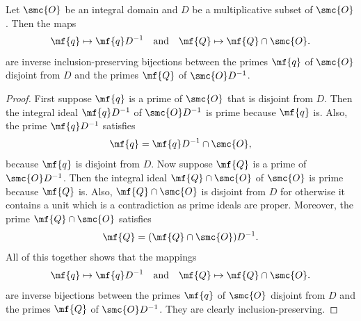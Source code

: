     \begin{proposition}\label{prop:localization_prime_bijection}
      Let \(\smc{O}\) be an integral domain and \(D\) be a multiplicative subset of \(\smc{O}\). Then the maps
      \[
        \mf{q} \mapsto \mf{q}D^{-1} \quad \text{and} \quad \mf{Q} \mapsto \mf{Q} \cap \smc{O}.
      \]
      are inverse inclusion-preserving bijections between the primes \(\mf{q}\) of \(\smc{O}\) disjoint from \(D\) and the primes \(\mf{Q}\) of \(\smc{O}D^{-1}\).
    \end{proposition}
    \begin{proof}
      First suppose \(\mf{q}\) is a prime of \(\smc{O}\) that is disjoint from \(D\). Then the integral ideal \(\mf{q}D^{-1}\) of \(\smc{O}D^{-1}\) is prime because \(\mf{q}\) is. Also, the prime \(\mf{q}D^{-1}\) satisfies
      \[
        \mf{q} = \mf{q}D^{-1} \cap \smc{O},
      \]
      because \(\mf{q}\) is disjoint from \(D\). Now suppose \(\mf{Q}\) is a prime of \(\smc{O}D^{-1}\). Then the integral ideal \(\mf{Q} \cap \smc{O}\) of \(\smc{O}\) is prime because \(\mf{Q}\) is. Also, \(\mf{Q} \cap \smc{O}\) is disjoint from \(D\) for otherwise it contains a unit which is a contradiction as prime ideals are proper. Moreover, the prime \(\mf{Q} \cap \smc{O}\) satisfies
      \[
        \mf{Q} = (\mf{Q} \cap \smc{O})D^{-1}.
      \]
      All of this together shows that the mappings
      \[
        \mf{q} \mapsto \mf{q}D^{-1} \quad \text{and} \quad \mf{Q} \mapsto \mf{Q} \cap \smc{O}.
      \]
      are inverse bijections between the primes \(\mf{q}\) of \(\smc{O}\) disjoint from \(D\) and the primes \(\mf{Q}\) of \(\smc{O}D^{-1}\). They are clearly inclusion-preserving.
    \end{proof}

